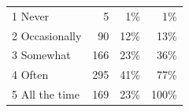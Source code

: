 \documentclass[empirical, authordate, issue]{jote-new-article}
\begin{document}
\begin{table}
\begin{tabularx}{\linewidth}{@{} X  r  r r@{}}
    1 Never                                 & 5        & 1\%               & 1\%                          \\
    2 Occasionally                          & 90       & 12\%              & 13\%                         \\
    3 Somewhat                              & 166      & 23\%              & 36\%                         \\
    4 Often                                 & 295      & 41\%              & 77\%                         \\
    5 All the time                          & 169      & 23\%              & 100\%                        \\
  \end{tabularx}


\end{table}

\addtocounter{table}{-1}
\end{document}
